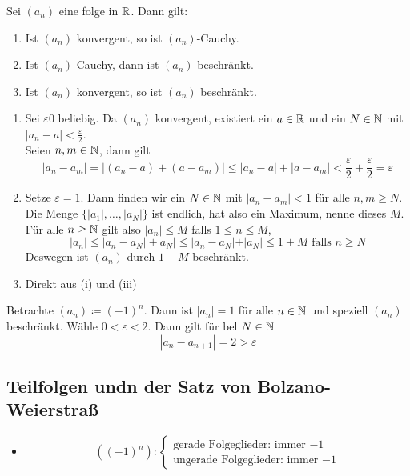 \begin{subtheorem}
	Sei $ (a_n) $ eine folge in $ \mathbb{R} $. Dann gilt:
	\begin{enumerate}[label=(\roman*)]
		\item Ist $ (a_n) $ konvergent, so ist $ (a_n) $-Cauchy.
		\item Ist $ (a_n) $ Cauchy, dann ist $ (a_n) $ beschränkt.
		\item Ist $ (a_n) $ konvergent, so ist $ (a_n) $ beschränkt.
	\end{enumerate}
	\begin{subproof*}
		\begin{enumerate}[label=(\roman*)]
			\item Sei $ \varepsilon 0 $ beliebig. Da $ (a_n) $ konvergent, existiert ein $ a \in \mathbb{R} $ und ein $ N \in \mathbb{N} $ mit $ |a_n - a| < \frac{\varepsilon}{2} $.\\
				Seien $ n, m \in \mathbb{N} $, dann gilt
				\[ | a_n - a_m| = | (a_n - a) + (a- a_m)| \leq |a_n - a| + |a - a_m| < \frac{\varepsilon}{2} + \frac{\varepsilon}{2} = \varepsilon \]
			\item Setze $ \varepsilon = 1 $. Dann finden wir ein $ N \in \mathbb{N} $ mit $ |a_n - a_m| < 1 $ für alle $ n, m \geq N $.\\
				Die Menge $ \{ |a_1|,\dotsc, |a_N| \} $ ist endlich, hat also ein Maximum, nenne dieses $ M $.\\
				Für alle $ n \geq \mathbb{N} $ gilt also $ |a_n| \leq M $ falls $ 1 \leq n \leq M $,
				\[ |a_n| \leq |a_n - a_N| + a_N| \leq |a_n - a_N| + |a_N| \leq 1 + M \text{ falls } n \geq N \]
				Deswegen ist $ (a_n) $ durch $ 1 + M $ beschränkt.
			\item Direkt aus (i) und (iii)
		\end{enumerate}
	\end{subproof*}
\end{subtheorem}
\begin{subexample}
	Betrachte $ (a_n) \coloneqq (-1)^n $. Dann ist $ |a_n| = 1 $ für alle $ n \in \mathbb{N} $ und speziell $ (a_n) $ beschränkt. Wähle $ 0 < \varepsilon < 2 $. Dann gilt für bel $ N \in \mathbb{N} $
	\[ |a_n - a_{n+1}| = 2 > \varepsilon \]
\end{subexample}

\subsection{Teilfolgen undn der Satz von Bolzano-Weierstraß}
\begin{itemize}
	\item \[ ( ( -1 )^n ) : \begin{cases} \text{gerade Folgeglieder: immer $-1$}\\\text{ungerade Folgeglieder: immer $-1$} \end{cases} \]
\end{itemize}

